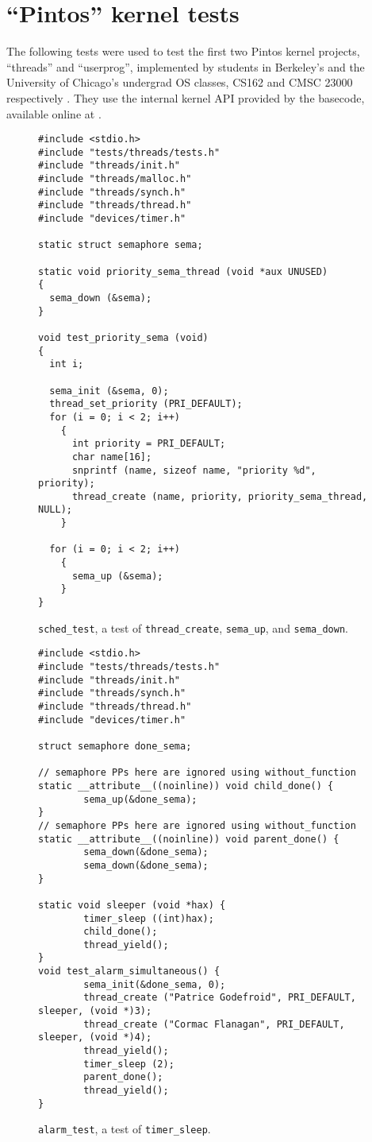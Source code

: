 \documentclass[pldi]{../sigplanconf-pldi15}
\begin{document}
\section{``Pintos'' kernel tests}

The following tests were used to test the first two Pintos kernel projects, ``threads'' and ``userprog'',
implemented by students in Berkeley's and the University of Chicago's undergrad OS classes,
CS162 and CMSC 23000 respectively \cite{pintos}.
They use the internal kernel API provided by the basecode, available online at \cite{pintos-github}.

\begin{figure*}
\begin{verbatim}
#include <stdio.h>
#include "tests/threads/tests.h"
#include "threads/init.h"
#include "threads/malloc.h"
#include "threads/synch.h"
#include "threads/thread.h"
#include "devices/timer.h"

static struct semaphore sema;

static void priority_sema_thread (void *aux UNUSED) 
{
  sema_down (&sema);
}

void test_priority_sema (void) 
{
  int i;

  sema_init (&sema, 0); 
  thread_set_priority (PRI_DEFAULT);
  for (i = 0; i < 2; i++)
    {   
      int priority = PRI_DEFAULT;
      char name[16];
      snprintf (name, sizeof name, "priority %d", priority);
      thread_create (name, priority, priority_sema_thread, NULL);
    }   

  for (i = 0; i < 2; i++)
    {   
      sema_up (&sema);
    }   
}
\end{verbatim}
	\caption{{\tt sched\_test},
	a test of {\tt thread\_create}, {\tt sema\_up}, and {\tt sema\_down}.}
	\label{fig:prisema}
\end{figure*}
\begin{figure*}
\begin{verbatim}
#include <stdio.h>
#include "tests/threads/tests.h"
#include "threads/init.h"
#include "threads/synch.h"
#include "threads/thread.h"
#include "devices/timer.h"

struct semaphore done_sema;

// semaphore PPs here are ignored using without_function
static __attribute__((noinline)) void child_done() {
        sema_up(&done_sema);
}
// semaphore PPs here are ignored using without_function
static __attribute__((noinline)) void parent_done() {
        sema_down(&done_sema);
        sema_down(&done_sema);
}

static void sleeper (void *hax) {
        timer_sleep ((int)hax);
        child_done();
        thread_yield();
}
void test_alarm_simultaneous() {
        sema_init(&done_sema, 0); 
        thread_create ("Patrice Godefroid", PRI_DEFAULT, sleeper, (void *)3);
        thread_create ("Cormac Flanagan", PRI_DEFAULT, sleeper, (void *)4);
        thread_yield();
        timer_sleep (2);
        parent_done();
        thread_yield();
}
\end{verbatim}
	\caption{{\tt alarm\_test},
	a test of {\tt timer\_sleep}.}
	\label{fig:alarm}
\end{figure*}
\end{document}
